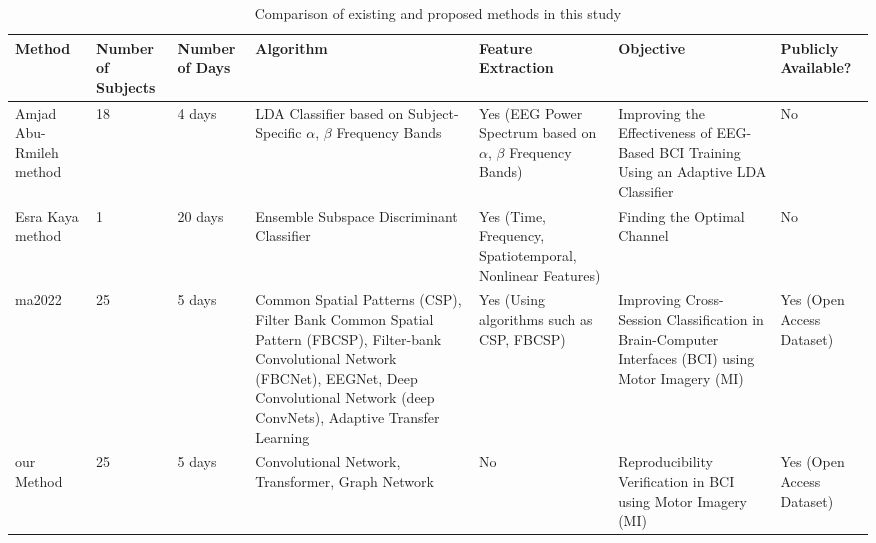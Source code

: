\documentclass{ieeeaccess}
\begin{document}
    
    
    \begin{table}
        \centering
        \caption{Comparison of existing and proposed methods in this study}
        \begin{tabularx}{\linewidth}{|X|X|X|X|X|X|X|}
            \hline
            Method & Number of Subjects & Number of Days & Algorithm & Feature Extraction & Objective & Publicly Available? \tabularnewline \hline
            Amjad Abu-Rmileh method\cite{kaya2023identifying} & 18 & 4 days & LDA Classifier based on Subject-Specific $\alpha$, $\beta$ Frequency Bands & Yes (EEG Power Spectrum based on $\alpha$, $\beta$ Frequency Bands) & Improving the Effectiveness of EEG-Based BCI Training Using an Adaptive LDA Classifier & No \tabularnewline \hline
            Esra Kaya method\cite{abu2019co} & 1 & 20 days & Ensemble Subspace Discriminant Classifier & Yes (Time, Frequency, Spatiotemporal, Nonlinear Features) & Finding the Optimal Channel & No \tabularnewline \hline
            ma2022\cite{ma2022large} & 25 & 5 days & Common Spatial Patterns (CSP), Filter Bank Common Spatial Pattern (FBCSP), Filter-bank Convolutional Network (FBCNet), EEGNet, Deep Convolutional Network (deep ConvNets), Adaptive Transfer Learning & Yes (Using algorithms such as CSP, FBCSP) & Improving Cross-Session Classification in Brain-Computer Interfaces (BCI) using Motor Imagery (MI) & Yes (Open Access Dataset) \tabularnewline \hline
            our Method & 25 & 5 days & Convolutional Network, Transformer, Graph Network & No & Reproducibility Verification in BCI using Motor Imagery (MI) & Yes (Open Access Dataset) \tabularnewline \hline
        \end{tabularx}
        \label{tab: Comparison of existing and proposed methods in this study}
    \end{table}
    
    
\end{document}
